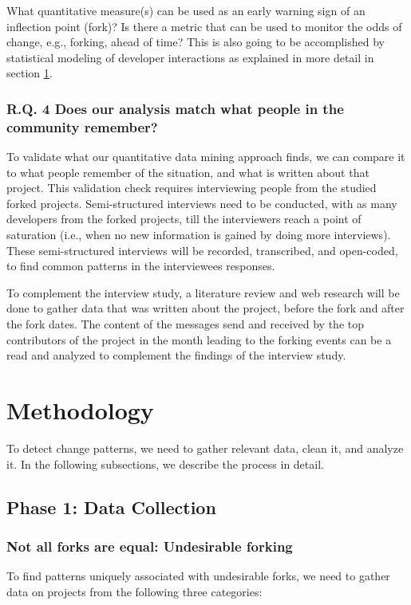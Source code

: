\documentclass{acm_proc_article-sp}
\begin{document}
What quantitative measure(s) can be used as an early warning sign of an inflection point (fork)? Is there a metric that can be used to monitor the odds of change, e.g., forking, ahead of time? This is also going to be accomplished by statistical modeling of developer interactions as explained in more detail in section \ref{methodology}.

\subsubsection*{R.Q. 4 \hspace{4 mm} Does our analysis match what people in the community remember?\\} 

To validate what our quantitative data mining approach finds, we can compare it to what people remember of the situation, and what is written about that project. This validation check requires interviewing people from the studied forked projects. Semi-structured interviews need to be conducted, with as many developers from the forked projects, till the interviewers reach a point of saturation (i.e., when no new information is gained by doing more interviews). These semi-structured interviews will be recorded, transcribed, and open-coded, to find common patterns in the interviewees responses.

To complement the interview study, a literature review and web research will be done to gather data that was written about the project, before the fork and after the fork dates. The content of the messages send and received by the top contributors of the project in the month leading to the forking events can be a read and analyzed to complement the findings of the interview study. 

\section{Methodology}
\label{methodology}

To detect change patterns, we need to gather  relevant data, clean it, and analyze it. In the following subsections, we describe the process in detail. 

\subsection{Phase 1: Data Collection}

\subsubsection{Not all forks are equal: Undesirable forking}
To find patterns uniquely associated with undesirable forks, we need to gather data on projects from the following three categories: 
\end{document}
